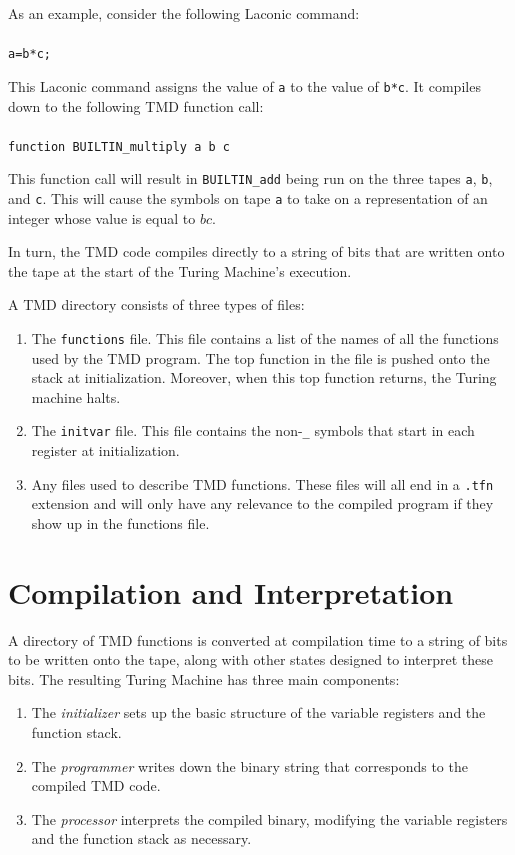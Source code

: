 \documentclass[11pt]{article}
\begin{document}
As an example, consider the following Laconic command: \\ \\
\texttt{a=b*c;} 

This Laconic command assigns the value of \texttt{a} to the value of \texttt{b*c}. It compiles down to the following TMD function call: \\ \\
\texttt{function BUILTIN\_multiply a b c}

This function call will result in \texttt{BUILTIN\_add} being run on the three tapes \texttt{a}, \texttt{b}, and \texttt{c}. This will cause the symbols on tape \texttt{a} to take on a representation of an integer whose value is equal to $bc$.

In turn, the TMD code compiles directly to a string of bits that are written onto the tape at the start of the Turing Machine's execution.

A TMD directory consists of three types of files:

\begin{enumerate}
\item The \texttt{functions} file. This file contains a list of the names of all the functions used by the TMD program. The top function in the file is pushed onto the stack at initialization. Moreover, when this top function returns, the Turing machine halts.
\item The \texttt{initvar} file. This file contains the non-\texttt{\_} symbols that start in each register at initialization. 
\item Any files used to describe TMD functions. These files will all end in a \texttt{.tfn} extension and will only have any relevance to the compiled program if they show up in the functions file.
\end{enumerate}

\section{Compilation and Interpretation}

A directory of TMD functions is converted at compilation time to a string of bits to be written onto the tape, along with other states designed to interpret these bits. The resulting Turing Machine has three main components:

\begin{enumerate}
\item The \emph{initializer} sets up the basic structure of the variable registers and the function stack.
\item The \emph{programmer} writes down the binary string that corresponds to the compiled TMD code.
\item The \emph{processor} interprets the compiled binary, modifying the variable registers and the function stack as necessary.
\end{enumerate}
\end{document}
